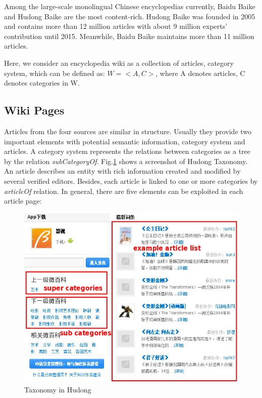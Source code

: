 \documentclass[runningheads,a4paper]{llncs}
\begin{document}
\begin{CJK*}{UTF8}{song}
Among the large-scale monolingual Chinese encyclopedias currently, Baidu Baike and Hudong Baike are the most content-rich. Hudong Baike was founded in 2005 and contains more than 12 million articles with about 9 million experts' contribution until 2015. Meanwhile, Baidu Baike maintains more than 11 million articles.

Here, we consider an encyclopedia wiki as a collection of articles, category system, which can be defined as: $W = <A,C>$, where A denotes articles, C denotes categories in W.

\subsection{Wiki Pages}
Articles from the four sources are similar in structure. Usually they provide two important elements with potential semantic information, category system and articles. A category system represents the relations between categories as a tree by the relation \textit{subCategoryOf}. Fig.\ref{fig:hudong-taxonomy} shows a screenshot of Hudong Taxonomy. An article describes an entity with rich information created and modified by several verified editors. Besides, each article is linked to one or more categories by \textit{articleOf} relation. In general, there are five elements can be exploited in each article page:
\begin{figure}
    \centering
    \begin{minipage}[t]{0.8\textwidth}
        \centerline{\includegraphics[width=0.8\columnwidth]{fig/hudong-taxonomy2}}
        \caption{Taxonomy in Hudong}
        \label{fig:hudong-taxonomy}
    \end{minipage}%
\end{figure}
\begin{itemize}

\end{itemize}
\end{CJK*}
\end{document}

